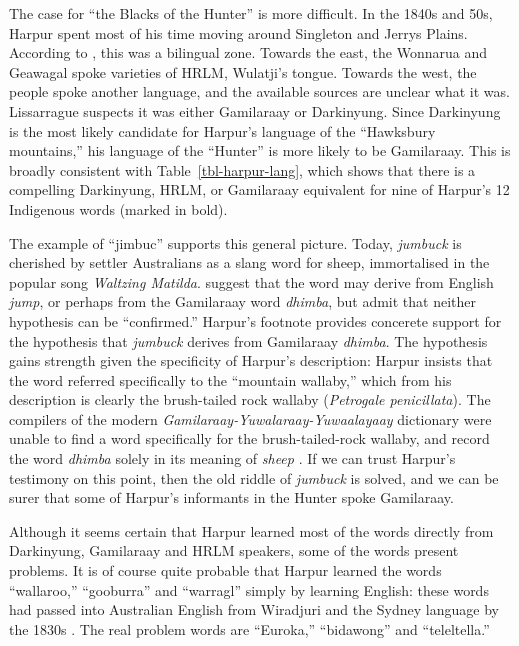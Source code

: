 \documentclass[
  Crown,
  times,
  sageh]{sagej}
\begin{document}
The case for ``the Blacks of the Hunter'' is more difficult. In the
1840s and 50s, Harpur spent most of his time moving around Singleton and
Jerrys Plains. According to \citet[13]{lissarrague_salvage_2006}, this
was a bilingual zone. Towards the east, the Wonnarua and Geawagal spoke
varieties of HRLM, Wulatji's tongue. Towards the west, the people spoke
another language, and the available sources are unclear what it was.
Lissarrague suspects it was either Gamilaraay or Darkinyung. Since
Darkinyung is the most likely candidate for Harpur's language of the
``Hawksbury mountains,'' his language of the ``Hunter'' is more likely
to be Gamilaraay. This is broadly consistent with
Table~\ref{tbl-harpur-lang}, which shows that there is a compelling
Darkinyung, HRLM, or Gamilaraay equivalent for nine of Harpur's 12
Indigenous words (marked in bold).

The example of ``jimbuc'' supports this general picture. Today,
\emph{jumbuck} is cherished by settler Australians as a slang word for
sheep, immortalised in the popular song \emph{Waltzing Matilda}.
\citet[56]{dixon_australian_2006} suggest that the word may derive from
English \emph{jump}, or perhaps from the Gamilaraay word \emph{dhimba},
but admit that neither hypothesis can be ``confirmed.'' Harpur's
footnote provides concerete support for the hypothesis that
\emph{jumbuck} derives from Gamilaraay \emph{dhimba}. The hypothesis
gains strength given the specificity of Harpur's description: Harpur
insists that the word referred specifically to the ``mountain wallaby,''
which from his description is clearly the brush-tailed rock wallaby
(\emph{Petrogale penicillata}). The compilers of the modern
\emph{Gamilaraay-Yuwalaraay-Yuwaalayaay} dictionary were unable to find
a word specifically for the brush-tailed-rock wallaby, and record the
word \emph{dhimba} solely in its meaning of \emph{sheep}
\citep[62]{lissarrague_gamilaraay_2003}. If we can trust Harpur's
testimony on this point, then the old riddle of \emph{jumbuck} is
solved, and we can be surer that some of Harpur's informants in the
Hunter spoke Gamilaraay.

Although it seems certain that Harpur learned most of the words directly
from Darkinyung, Gamilaraay and HRLM speakers, some of the words present
problems. It is of course quite probable that Harpur learned the words
``wallaroo,'' ``gooburra'' and ``warragl'' simply by learning English:
these words had passed into Australian English from Wiradjuri and the
Sydney language by the 1830s \citep{dixon_australian_2006}. The real
problem words are ``Euroka,'' ``bidawong'' and ``teleltella.''
\end{document}
